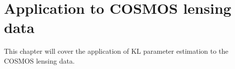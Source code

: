 \chapter{Application to COSMOS lensing data}

This chapter will cover the application of KL parameter estimation to the 
COSMOS lensing data.